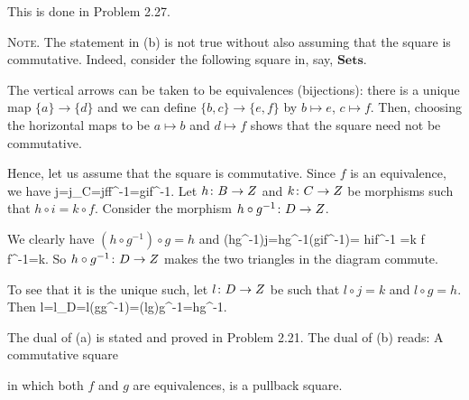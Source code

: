 \bs
\ben[label=(\alph*)]
\item This is done in Problem 2.27.
\item {\scshape Note}. The statement in (b) is not true without also assuming that the square is commutative. Indeed, consider the following square in, say, $\mathbf{Sets}$.
\bse
{}
\ese
The vertical arrows can be taken to be equivalences (bijections): there is a unique map $\{a\}\to\{d\}$ and we can define $\{b,c\}\to\{e,f\}$ by $b\mapsto e$, $c\mapsto f$. Then, choosing the horizontal maps to be $a\mapsto b$ and $d\mapsto f$ shows that the square need not be commutative.

Hence, let us assume that the square is commutative. Since $f$ is an equivalence, we have
\bse
j=j\circ \id_C=j\circ f\circ f^{-1}=g\circ i\circ f^{-1}.
\ese
Let $h\colon B\to Z$ and $k\colon C\to Z$ be morphisms such that $h\circ i=k\circ f$. Consider the morphism $h\circ g^{-1}\colon D\to Z$.
\bse
{}
\ese
We clearly have $(h\circ g^{-1})\circ g=h$ and
\bse
(h\circ g^{-1})\circ j=h\circ g^{-1}\circ (g\circ i\circ f^{-1})= h\circ i\circ f^{-1} =k \circ f \circ f^{-1}=k.
\ese
So $h\circ g^{-1}\colon D\to Z$ makes the two triangles in the diagram commute.

To see that it is the unique such, let $l\colon D\to Z$ be such that $l\circ j=k$ and $l\circ g=h$. Then
\bse
l=l\circ \id_D=l\circ (g\circ g^{-1})=(l\circ g)\circ g^{-1}=h\circ g^{-1}.
\ese
\item The dual of (a) is stated and proved in Problem 2.21. The dual of (b) reads: A commutative square
\bse
{}
\ese
in which both $f$ and $g$ are equivalences, is a pullback square.

